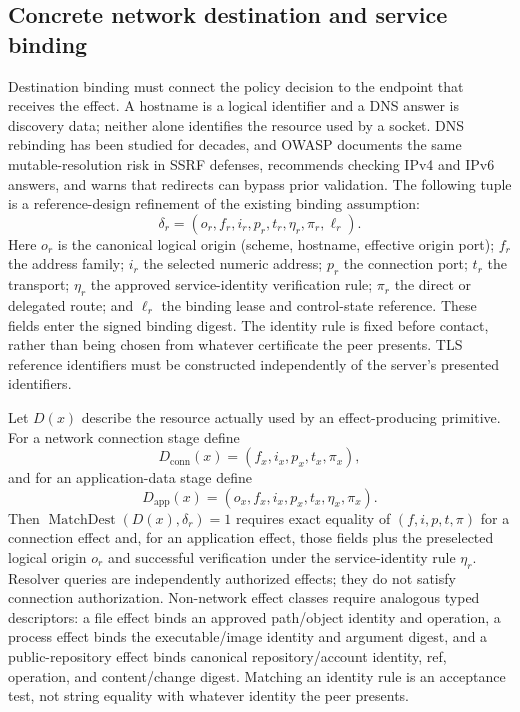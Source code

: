 \documentclass[11pt,letterpaper]{article}
\begin{document}
\subsection{Concrete network destination and service binding}
\label{sec:concrete-binding}
Destination binding must connect the policy decision to the endpoint that receives the effect. A hostname is a logical identifier and a DNS answer is discovery data; neither alone identifies the resource used by a socket. DNS rebinding has been studied for decades, and OWASP documents the same mutable-resolution risk in SSRF defenses, recommends checking IPv4 and IPv6 answers, and warns that redirects can bypass prior validation.\cite{jackson2009,owasp-ssrf} The following tuple is a reference-design refinement of the existing binding assumption:
\[
\delta_r=(o_r,f_r,i_r,p_r,t_r,\eta_r,\pi_r,\ell_r).
\]
Here $o_r$ is the canonical logical origin (scheme, hostname, effective origin port); $f_r$ the address family; $i_r$ the selected numeric address; $p_r$ the connection port; $t_r$ the transport; $\eta_r$ the approved service-identity verification rule; $\pi_r$ the direct or delegated route; and $\ell_r$ the binding lease and control-state reference. These fields enter the signed binding digest. The identity rule is fixed before contact, rather than being chosen from whatever certificate the peer presents. TLS reference identifiers must be constructed independently of the server's presented identifiers.\cite{rfc9525}

Let $D(x)$ describe the resource actually used by an effect-producing primitive. For a network connection stage define
\[
D_{\mathrm{conn}}(x)=(f_x,i_x,p_x,t_x,\pi_x),
\]
and for an application-data stage define
\[
D_{\mathrm{app}}(x)=(o_x,f_x,i_x,p_x,t_x,\eta_x,\pi_x).
\]
Then $\operatorname{MatchDest}(D(x),\delta_r)=1$ requires exact equality of $(f,i,p,t,\pi)$ for a connection effect and, for an application effect, those fields plus the preselected logical origin $o_r$ and successful verification under the service-identity rule $\eta_r$. Resolver queries are independently authorized effects; they do not satisfy connection authorization. Non-network effect classes require analogous typed descriptors: a file effect binds an approved path/object identity and operation, a process effect binds the executable/image identity and argument digest, and a public-repository effect binds canonical repository/account identity, ref, operation, and content/change digest. Matching an identity rule is an acceptance test, not string equality with whatever identity the peer presents.
\end{document}

